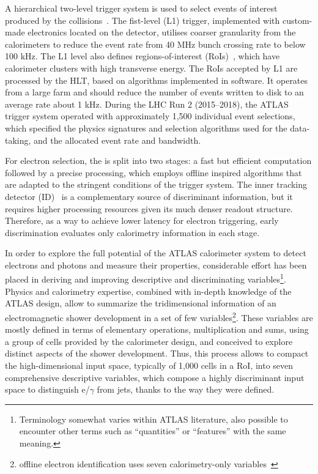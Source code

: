 A hierarchical two-level trigger system is used to select events of interest produced by the collisions~\cite{aad2020performance}. 
The fist-level (L1) trigger, implemented with custom-made electronics located on the detector, utilises coarser granularity from the calorimeters to reduce the event rate from 40 MHz bunch crossing rate to below 100 kHz. 
The L1 level also defines regions-of-interest (RoIs)~\cite{CERN-LHCC-2017-020}, which have calorimeter clusters with high transverse energy. The RoIs accepted by L1 are processed by the HLT, based on algorithms implemented in software. It operates from a large farm and should reduce the number of events written to disk to an average rate about 1 kHz. During the LHC Run 2 (2015–2018), the ATLAS trigger system operated with approximately 1,500 individual event selections, which specified the physics signatures and selection algorithms used for the data-taking, and the allocated event rate and bandwidth.

For electron selection, the \hlt{} is split into two stages: a fast but efficient computation followed by a precise processing, which employs offline inspired algorithms that are adapted to the stringent conditions of the trigger system. The inner tracking detector (ID)~\cite{PERF-2007-01} is a complementary source of discriminant information, but it requires higher processing resources given its much denser readout structure.  Therefore, as a way to achieve lower latency for electron triggering, early discrimination evaluates only calorimetry information in each stage.


In order to explore the full potential of the ATLAS calorimeter system to detect electrons and photons and measure their properties, considerable effort has been placed in deriving and improving descriptive and discriminating variables\footnote{Terminology somewhat varies within ATLAS literature, also possible to encounter other terms such as ``quantities'' or ``features'' with the same meaning.}. Physics and calorimetry expertise,
combined with in-depth knowledge of the ATLAS design, allow to summarize the tridimensional information of an electromagnetic shower development in a set of few
variables\footnote{offline electron identification uses seven calorimetry-only
variables~\cite{aaboud2019electron}}. These variables are mostly defined in
terms of elementary operations, multiplication and sums, using a group of cells provided by the calorimeter
design, and conceived to explore distinct aspects of the shower development. Thus, this process allows to compact the high-dimensional input space, typically of 1,000 cells in a RoI, into seven comprehensive descriptive variables, which compose a highly discriminant input space to distinguish e/$\gamma$ from jets, thanks to the way they were defined.

